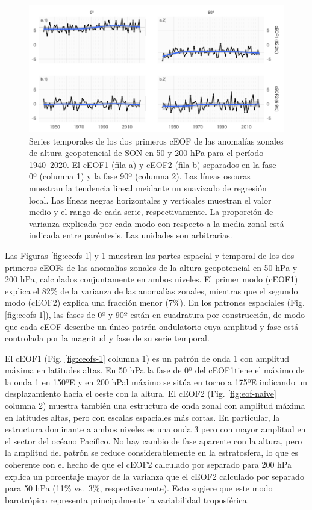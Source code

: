 \documentclass[12pt,oneside,a4paper]{reedthesis}
\begin{document}
\begin{figure}

{\centering \includegraphics{figures/20-ceofs/extended-series-1} 

}

\caption{Series temporales de los dos primeros cEOF de las anomalías zonales de altura geopotencial de SON en 50 y 200 hPa para el período 1940--2020. El cEOF1 (fila a) y cEOF2 (fila b) separados en la fase 0º (columna 1) y la fase 90º (columna 2). Las líneas oscuras muestran la tendencia lineal meidante un suavizado de regresión local. Las líneas negras horizontales y verticales muestran el valor medio y el rango de cada serie, respectivamente. La proporción de varianza explicada por cada modo con respecto a la media zonal está indicada entre paréntesis. Las unidades son arbitrarias.}\label{fig:extended-series}
\end{figure}

Las Figuras \ref{fig:ceofs-1} y \ref{fig:extended-series} muestran las partes espacial y temporal de los dos primeros cEOFs de las anomalías zonales de la altura geopotencial en 50 hPa y 200 hPa, calculados conjuntamente en ambos niveles.
El primer modo (cEOF1) explica el 82\% de la varianza de las anomalías zonales, mientras que el segundo modo (cEOF2) explica una fracción menor (7\%).
En los patrones espaciales (Fig. \ref{fig:ceofs-1}), las fases de 0º y 90º están en cuadratura por construcción, de modo que cada cEOF describe un único patrón ondulatorio cuya amplitud y fase está controlada por la magnitud y fase de su serie temporal.

El cEOF1 (Fig. \ref{fig:ceofs-1} columna 1) es un patrón de onda 1 con amplitud máxima en latitudes altas.
En 50 hPa la fase de 0º del cEOF1tiene el máximo de la onda 1 en 150ºE y en 200 hPal máximo se sitúa en torno a 175ºE indicando un desplazamiento hacia el oeste con la altura.
El cEOF2 (Fig. \ref{fig:eof-naive} columna 2) muestra también una estructura de onda zonal con amplitud máxima en latitudes altas, pero con escalas espaciales más cortas.
En particular, la estructura dominante a ambos niveles es una onda 3 pero con mayor amplitud en el sector del océano Pacífico.
No hay cambio de fase aparente con la altura, pero la amplitud del patrón se reduce considerablemente en la estratosfera, lo que es coherente con el hecho de que el cEOF2 calculado por separado para 200 hPa explica un porcentaje mayor de la varianza que el cEOF2 calculado por separado para 50 hPa (11\% vs.~3\%, respectivamente).
Esto sugiere que este modo barotrópico representa principalmente la variabilidad troposférica.
\end{document}
